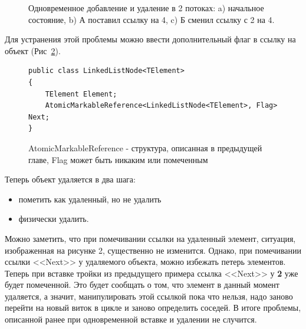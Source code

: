 \documentclass[12pt]{article}
\begin{document}
{\begin{figure}[h!]
\begin{minipage}[h]{0.45\linewidth}
{							\label{pic:insertDeleteC}
						}
					\end{minipage}
					\caption{Одновременное добавление и удаление в 2 потоках: a) начальное состояние, b) А поставил ссылку на 4, c) Б сменил ссылку с 2 на 4.}
				\end{figure}
				\par Для устранения этой проблемы можно ввести дополнительный флаг в ссылку на объект (Рис~\ref{pic:listAMR}).
				\begin{figure}[h]
					\begin{lstlisting}
public class LinkedListNode<TElement>
{
	TElement Element;
	AtomicMarkableReference<LinkedListNode<TElement>, Flag> Next;
}
					\end{lstlisting}
					\caption{AtomicMarkableReference - структура, описанная в предыдущей главе, Flag может быть никаким или помеченным}
					\label{pic:listAMR}
				\end{figure}
				\par Теперь объект удаляется в два шага: 
				\begin{itemize}
					\item пометить как удаленный, но не удалить
					\item физически удалить. 
				\end{itemize}
				Можно заметить, что при помечивании ссылки на удаленный элемент, ситуация, изображенная на рисунке 2, существенно не изменится. Однако, при помечивании ссылки <<Next>> у удаляемого объекта, можно избежать петерь элементов. Теперь при вставке тройки из предыдущего примера ссылка <<Next>> у \textbf{2} уже будет помеченной. Это будет сообщать о том, что элемент в данный момент удаляется, а значит, манипулировать этой ссылкой пока что нельзя, надо заново перейти на новый виток в цикле и заново определить соседей. В итоге проблемы, описанной ранее при одновременной вставке и удалении не случится.
}
\end{document}
